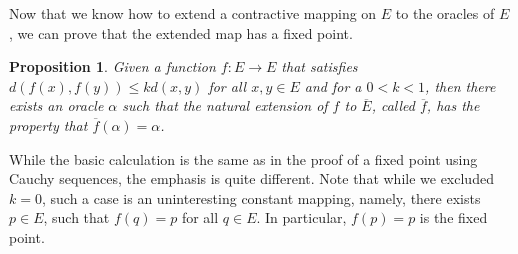 \documentclass[12pt]{article}
\newtheorem{proposition}{Proposition}[section]
\begin{document}
Now that we know how to extend a contractive mapping on $E$ to the oracles of $E$, we can prove that the extended map has a fixed point. 

\begin{proposition}
    Given a function $f:E \to E$ that satisfies $d(f(x), f(y)) \leq k d(x, y)$ for all $x, y \in E$ and for a $0 < k < 1$, then there exists an oracle $\alpha$ such that the natural extension of $f$ to $\overline{E}$, called $\overline{f}$, has the property that $\overline{f}(\alpha) = \alpha$.
\end{proposition}

While the basic calculation is the same as in the proof of a fixed point using Cauchy sequences, the emphasis is quite different. Note that while we excluded $k=0$, such a case is an uninteresting constant mapping, namely, there exists $p \in E$, such that $f(q) = p$ for all $q \in E$. In particular, $f(p) = p$ is the fixed point. 
\end{document}
